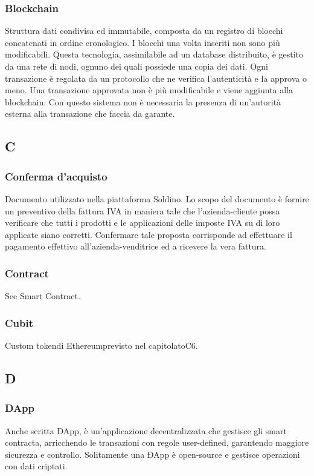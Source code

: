 \subsubsection*{Blockchain}
Struttura dati condivisa ed immutabile, composta da un registro di blocchi concatenati in ordine cronologico. I blocchi una volta inseriti non sono più modificabili. Questa tecnologia, assimilabile ad un database distribuito, è gestito da una rete di nodi, ognuno dei quali possiede una copia dei dati.  Ogni transazione è regolata da un protocollo che ne verifica l'autenticità e la approva o meno. Una transazione approvata non è più modificabile e viene aggiunta alla blockchain. Con questo sistema non è necessaria la presenza di un'autorità esterna alla transazione che faccia da garante.


\subsection*{C}


\subsubsection*{Conferma d'acquisto}
Documento utilizzato nella piattaforma Soldino. Lo scopo del documento è fornire un preventivo della fattura IVA in maniera tale che l'azienda-cliente possa verificare che tutti i prodotti e le applicazioni delle imposte IVA su di loro applicate siano corretti. Confermare tale proposta corrisponde ad effettuare il pagamento effettivo all'azienda-venditrice ed a ricevere la vera fattura.


\subsubsection*{Contract}
See Smart Contract. 


\subsubsection*{Cubit}
Custom token\glosp di Ethereum\glosp previsto nel capitolato\glosp C6.

\subsection*{D}

\subsubsection*{DApp}
Anche scritta ÐApp, è un'applicazione decentralizzata che gestisce gli smart contracta\glo, arricchendo le transazioni con regole user-defined, garantendo maggiore sicurezza e controllo. Solitamente una ÐApp è open-source e  gestisce operazioni con dati criptati.

